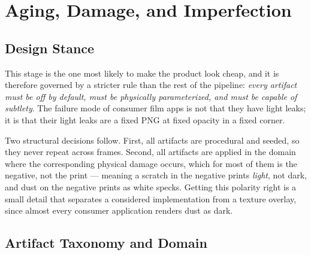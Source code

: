 \section{Aging, Damage, and Imperfection}
\label{sec:aging}

\subsection{Design Stance}

This stage is the one most likely to make the product look cheap, and it is
therefore governed by a stricter rule than the rest of the pipeline: \emph{every
artifact must be off by default, must be physically parameterized, and must be
capable of subtlety}. The failure mode of consumer film apps is not that they
have light leaks; it is that their light leaks are a fixed PNG at fixed opacity
in a fixed corner.

Two structural decisions follow. First, all artifacts are procedural and seeded,
so they never repeat across frames. Second, all artifacts are applied in the
domain where the corresponding physical damage occurs, which for most of them is
the negative, not the print --- meaning a scratch in the negative prints
\emph{light}, not dark, and dust on the negative prints as white specks. Getting
this polarity right is a small detail that separates a considered
implementation from a texture overlay, since almost every consumer application
renders dust as dark.

\subsection{Artifact Taxonomy and Domain}

